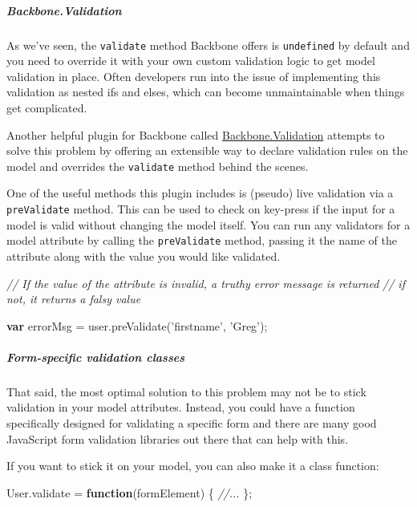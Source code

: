 \documentclass[9pt]{book}
\newenvironment{Shaded}{}{}
\newcommand{\KeywordTok}[1]{\textcolor[rgb]{0.00,0.44,0.13}{\textbf{{#1}}}}
\newcommand{\StringTok}[1]{\textcolor[rgb]{0.25,0.44,0.63}{{#1}}}
\newcommand{\CommentTok}[1]{\textcolor[rgb]{0.38,0.63,0.69}{\textit{{#1}}}}
\newcommand{\OtherTok}[1]{\textcolor[rgb]{0.00,0.44,0.13}{{#1}}}
\newcommand{\FunctionTok}[1]{\textcolor[rgb]{0.02,0.16,0.49}{{#1}}}
\newcommand{\NormalTok}[1]{{#1}}
\begin{document}
\subparagraph{Backbone.Validation}\label{backbone.validation}

As we've seen, the \texttt{validate} method Backbone offers is
\texttt{undefined} by default and you need to override it with your own
custom validation logic to get model validation in place. Often
developers run into the issue of implementing this validation as nested
ifs and elses, which can become unmaintainable when things get
complicated.

Another helpful plugin for Backbone called
\href{https://github.com/thedersen/backbone.validation}{Backbone.Validation}
attempts to solve this problem by offering an extensible way to declare
validation rules on the model and overrides the \texttt{validate} method
behind the scenes.

One of the useful methods this plugin includes is (pseudo) live
validation via a \texttt{preValidate} method. This can be used to check
on key-press if the input for a model is valid without changing the
model itself. You can run any validators for a model attribute by
calling the \texttt{preValidate} method, passing it the name of the
attribute along with the value you would like validated.

\begin{Shaded}
\begin{Highlighting}[]
\CommentTok{// If the value of the attribute is invalid, a truthy error message is returned}
\CommentTok{// if not, it returns a falsy value}

\KeywordTok{var} \NormalTok{errorMsg = }\OtherTok{user}\NormalTok{.}\FunctionTok{preValidate}\NormalTok{(}\StringTok{'firstname'}\NormalTok{, }\StringTok{'Greg'}\NormalTok{);}
\end{Highlighting}
\end{Shaded}

\subparagraph{Form-specific validation
classes}\label{form-specific-validation-classes}

That said, the most optimal solution to this problem may not be to stick
validation in your model attributes. Instead, you could have a function
specifically designed for validating a specific form and there are many
good JavaScript form validation libraries out there that can help with
this.

If you want to stick it on your model, you can also make it a class
function:

\begin{Shaded}
\begin{Highlighting}[]
\OtherTok{User}\NormalTok{.}\FunctionTok{validate} \NormalTok{= }\KeywordTok{function}\NormalTok{(formElement) \{}
  \CommentTok{//...}
\NormalTok{\};}
\end{Highlighting}
\end{Shaded}
\end{document}
